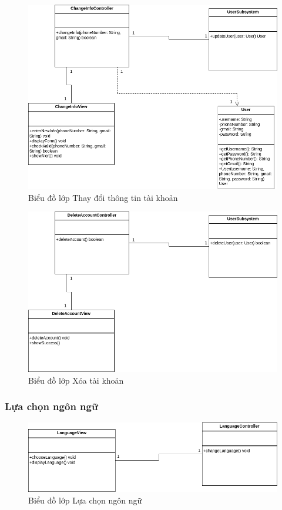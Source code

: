 \begin{figure}[H]
    \centering
    \includegraphics[width=\textwidth]{img3.4.2/Design_diagram-Lớp thay đổi thông tin.drawio.png} 
    \caption{Biểu đồ lớp Thay đổi thông tin tài khoản}
\end{figure}

\begin{figure}[H]
    \centering
    \includegraphics[width=\textwidth]{img3.4.2/Design_diagram-Lớp xóa tài khoản.drawio.png} 
    \caption{Biểu đồ lớp Xóa tài khoản}
\end{figure}

\subsubsection{Lựa chọn ngôn ngữ}
\begin{figure}[H]
    \centering
    \includegraphics[width=\textwidth]{img3.4.2/Design_diagram-Lớp chọn ngôn ngữ.drawio.png} 
    \caption{Biểu đồ lớp Lựa chọn ngôn ngữ}
\end{figure}

